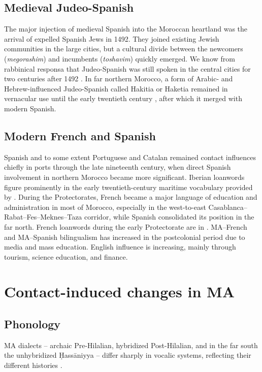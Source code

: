 \documentclass[output=paper]{langsci/langscibook}
\begin{document}
\subsection{Medieval Judeo-Spanish}

The major injection of medieval Spanish into the Moroccan heartland was the arrival of expelled Spanish Jews in 1492. They joined existing Jewish communities in the large cities, but a cultural divide between the newcomers (\textit{megorashim}) and incumbents (\textit{toshavim}) quickly emerged. We know from rabbinical responsa that Judeo-Spanish was still spoken in the central cities for two centuries after 1492 \citep{Chetrit1985}. In far northern Morocco, a form of Arabic- and Hebrew-influenced Judeo-Spanish called Hakitia or Haketia remained in vernacular use until the early twentieth century \citep{Benoliel1977}, after which it merged with modern Spanish.

\subsection{Modern French and Spanish}

Spanish and to some extent Portuguese and Catalan remained contact influences chiefly in ports through the late nineteenth century, when direct Spanish involvement in northern Morocco became more significant. Iberian loanwords figure prominently in the early twentieth-century maritime vocabulary provided by \citet{Brunot1920}. During the Protectorates, French became a major language of education and administration in most of Morocco, especially in the west-to-east Casablanca–Rabat–Fes–Meknes–Taza corridor, while Spanish consolidated its position in the far north. French loanwords during the early Protectorate are in \citet{Brunot1949}. MA–French and MA–Spanish bilingualism has increased in the postcolonial period due to media and mass education. English influence is increasing, mainly through tourism, science education, and finance.

\section{Contact-induced changes in MA}

\subsection{Phonology}

MA dialects – archaic Pre-Hilalian, hybridized Post-Hilalian, and in the far south the unhybridized Ḥassāniyya – differ sharply in vocalic systems, reflecting their different histories \citep{Heath2018}.
\end{document}
